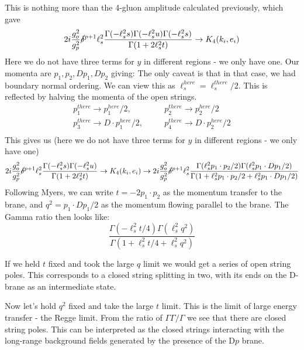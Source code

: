 \documentclass[11pt, class=article, crop=false]{standalone}
\begin{document}
\begin{enumerate}
	This is nothing more than the 4-gluon amplitude calculated previously, which gave
	\[
		2 i \frac{g_o^2}{g_p^2} \cancel\delta^{p+1} \ell_s^2 \frac{\Gamma(-\ell_s^2 s) \Gamma(-\ell_s^2 u)\Gamma(-\ell_s^2 s)}{\Gamma(1 + 2 \ell_s^2 t)} \to  K_4(k_i, e_i)
	\]
	Here we do not have three terms for $y$ in different regions - we only have one. Our momenta are $p_1, p_2, D p_1, D p_2$ giving:
	 The only caveat is that in that case, we had boundary normal ordering. We can view this as $\ell_s^{here} = \ell_s^{there}/2$. This is reflected by halving the momenta of the open strings.
 	\[
 		\begin{aligned}
 			p_1^{there} \to p_1^{here}/2, &\quad& p_2^{there} \to p_2^{here}/2\\
 			p_3^{there} \to D\cdot p_1^{here}/2, &\quad& p_4^{there} \to D \cdot p_2^{here}/2\\
 		\end{aligned}
 	\]
 	This gives us (here we do not have three terms for $y$ in different regions - we only have one)
 	\[
 		2 i \frac{g_o^2}{g_p^2} \cancel\delta^{p+1} \ell_s^2 \frac{\Gamma(-\ell_s^2 s) \Gamma(-\ell_s^2 u)}{\Gamma(1 + 2 \ell_s^2 t)} \to  K_4(k_i, e_i)
 		\to 2 i \frac{g_o^2}{g_p^2} \cancel\delta^{p+1} \ell_s^2
 		\frac{\Gamma(\ell_s^2 p_1 \cdot p_2/2) \Gamma(\ell_s^2 p_1 \cdot D p_1 /2)}{\Gamma(1 + \ell_s^2 p_1 \cdot p_2 / 2 + \ell_s^2 p_1 \cdot D p_1 /2)}
 	\]
	Following Myers, we can write $t = -2 p_1 \cdot p_2$ as the momentum transfer to the brane, and $q^2 = p_1 \cdot D p_1/2$ as the momentum flowing parallel to the brane. The Gamma ratio then looks like:
	\[
		\frac{\Gamma(-\ell_s^2 t/4) \Gamma(\ell_s^2 q^2)}{\Gamma(1 + \ell_s^2 t / 4 + \ell_s^2 q^2)}
	\]

	If we held $t$ fixed and took the large $q$ limit we would get a series of open string poles. This corresponds to a closed string splitting in two, with its ends on the D-brane as an intermediate state.
	
	Now let's hold $q^2$ fixed and take the large $t$ limit. This is the limit of large energy transfer - the Regge limit. From the ratio of $\Gamma \Gamma/\Gamma$ we see that there are closed string poles. This can be interpreted as the closed strings interacting with the long-range background fields generated by the presence of the D$p$ brane. 
	

\end{enumerate}
\end{document}
